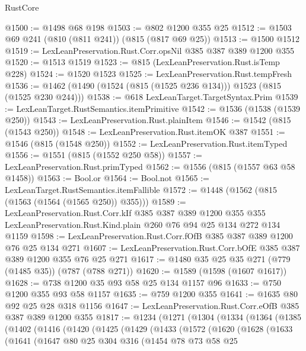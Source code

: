 \begin{lexlean}{RustCore}
\begin{coremodule}
{\begin{coremodule}
{{{{{{@1500 := @1498 @68 @198
@1503 := @802 @1200 @355 @25
@1512 := @1503 @69 @241 (@810 (@811 @241)) (@815 (@817 @69 @25))
@1513 := @1500 @1512
@1519 := LexLeanPreservation.Rust.Corr.opsNil @385 @387 @389 @1200 @355
@1520 := @1513 @1519
@1523 := @815 (LexLeanPreservation.Rust.isTemp @228)
@1524 := @1520 @1523
@1525 := LexLeanPreservation.Rust.tempFresh
@1536 := @1462 (@1490 (@1524 (@815 (@1525 @236 @134))) @1523 (@815 (@1525 @230 @244)))
@1538 := @618 LexLeanTarget.TargetSyntax.Prim
@1539 := LexLeanTarget.RustSemantics.itemPrimitive
@1542 := @1536 (@1538 (@1539 @250))
@1543 := LexLeanPreservation.Rust.plainItem
@1546 := @1542 (@815 (@1543 @250))
@1548 := LexLeanPreservation.Rust.itemOK @387
@1551 := @1546 (@815 (@1548 @250))
@1552 := LexLeanPreservation.Rust.itemTyped
@1556 := @1551 (@815 (@1552 @250 @58))
@1557 := LexLeanPreservation.Rust.primTyped
@1562 := @1556 (@815 (@1557 @63 @58 @1458))
@1563 := Bool.or
@1564 := Bool.not
@1565 := LexLeanTarget.RustSemantics.itemFallible
@1572 := @1448 (@1562 (@815 (@1563 (@1564 (@1565 @250)) @355)))
@1589 := LexLeanPreservation.Rust.Corr.kIf
    @385
    @387
    @389
    @1200
    @355
    @355
    LexLeanPreservation.Rust.Kind.plain
    @260
    @76
    @94
    @25
    @134
    @272
    @134
    @1159
@1598 := LexLeanPreservation.Rust.Corr.fOfB @385 @387 @389 @1200 @76 @25 @134 @271
@1607 := LexLeanPreservation.Rust.Corr.bOfE @385 @387 @389 @1200 @355 @76 @25 @271
@1617 := @1480 @35 @25 @35 @271 (@779 (@1485 @35)) (@787 (@788 @271))
@1620 := @1589 (@1598 (@1607 @1617))
@1628 := @738 @1200 @35 @93 @58 @25 @134 @1157 @96
@1633 := @750 @1200 @355 @93 @58 @1157
@1635 := @759 @1200 @355
@1641 := @1635 @80 @92 @25 @28 @318 @1156
@1647 := LexLeanPreservation.Rust.Corr.eOfB @385 @387 @389 @1200 @355
@1817 := @1234
    (@1271
      (@1304
        (@1334
          (@1364
            (@1385
              (@1402
                (@1416
                  (@1420
                    (@1425
                      (@1429
                        (@1433
                          (@1572
                            (@1620
                              (@1628
                                (@1633
                                  (@1641
                                    (@1647
                                      @80
                                      @25
                                      @304
                                      @316
                                      (@1454
                                        @78
                                        @73
                                        @58
                                        @25
}}}}}}
\end{coremodule}}
\end{coremodule}
\end{lexlean}
